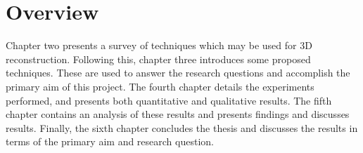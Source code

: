 \section{Overview}

Chapter two presents a survey of techniques which may be used for 3D reconstruction. Following this, chapter three introduces some proposed techniques. These are used to answer the research questions and accomplish the primary aim of this project. The fourth chapter details the experiments performed, and presents both quantitative and qualitative results. The fifth chapter contains an analysis of these results and presents findings and discusses results. Finally, the sixth chapter concludes the thesis and discusses the results in terms of the primary aim and research question. 


